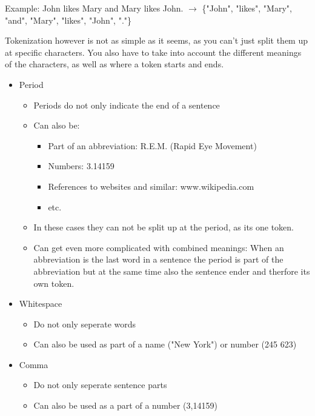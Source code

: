 \documentclass[
../../NLP4W_Summary.tex,
]
{subfiles}
\begin{document}
Example: John likes Mary and Mary likes John. $\rightarrow$ \{"John", "likes", "Mary", "and", "Mary", "likes", "John", "."\}

Tokenization however is not as simple as it seems, as you can't just split them up at specific characters. You also have to take into account the different meanings of the characters, as well as where a token starts and ends.
\begin{defbox}
    \begin{itemize}
        \item Period
        \begin{itemize}
            \item Periods do not only indicate the end of a sentence
            \item Can also be:
            \begin{itemize}
                \item Part of an abbreviation: R.E.M. (Rapid Eye Movement)
                \item Numbers: 3.14159
                \item References to websites and similar: www.wikipedia.com
                \item etc.
            \end{itemize}
            \item In these cases they can not be split up at the period, as its one token.
            \item Can get even more complicated with combined meanings: When an abbreviation is the last word in a sentence the period is part of the abbreviation but at the same time also the sentence ender and therfore its own token.
        \end{itemize}
        \item Whitespace
        \begin{itemize}
            \item Do not only seperate words
            \item Can also be used as part of a name ("New York") or number (245 623)
        \end{itemize}
        \item Comma
        \begin{itemize}
            \item Do not only seperate sentence parts
            \item Can also be used as a part of a number (3,14159)
        \end{itemize}

\end{itemize}
\end{defbox}
\end{document}
